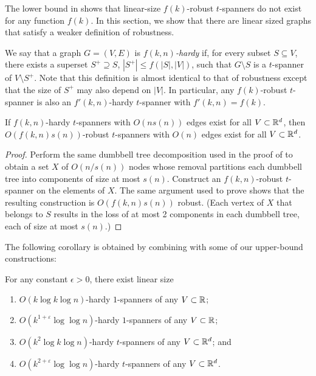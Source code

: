 \documentclass{patmorin}
\newcommand{\eps}{\varepsilon}
\begin{document}
The lower bound in  shows that linear-size
$f(k)$-robust $t$-spanners do not exist for any function $f(k)$.  In this
section, we show that there are linear sized graphs that satisfy a weaker
definition of robustness.

We say that a graph $G=(V,E)$ is \emph{$f(k,n)$-hardy} if, for every
subset $S\subseteq V$, there exists a superset $S^+\supseteq S$,
$|S^+|\le f(|S|,|V|)$, such that $G\setminus S$ is a $t$-spanner of
$V\setminus S^+$.  Note that this definition is almost identical to that
of robustness except that the size of $S^+$ may also depend on $|V|$.  In particular, any $f(k)$-robust $t$-spanner is also an $f'(k,n)$-hardy $t$-spanner with $f'(k,n)=f(k)$.

\begin{thm}
  If $f(k,n)$-hardy $t$-spanners with $O(n s(n))$ edges exist for
  all $V\subset\mathbb{R}^d$, then $O(f(k,n)s(n))$-robust $t$-spanners with
  $O(n)$ edges exist for all $V\subset\mathbb{R}^d$.
\end{thm}

\begin{proof}
  Perform the same dumbbell tree decomposition used in the proof of
   to obtain a set $X$ of $O(n/s(n))$ nodes whose removal
  partitions each dumbbell tree into components of size at most $s(n)$.
  Construct an $f(k,n)$-robust $t$-spanner on the elements of $X$.
  The same argument used to prove  shows that the resulting
  construction is $O(f(k,n)s(n))$ robust.  (Each vertex of $X$ that
  belongs to $S$ results in the loss of at most 2 components in each
  dumbbell tree, each of size at most $s(n)$.)
\end{proof}

The following corollary is obtained by combining 
with some of our upper-bound constructions:
\begin{cor}
  For any constant $\epsilon >0$,
  there exist linear size
  \begin{enumerate}
    \item $O(k\log k\log n)$-hardy $1$-spanners of any
      $V\subset \mathbb{R}$;
    \item $O(k^{1+\eps}\log\log n)$-hardy $1$-spanners of any
      $V\subset \mathbb{R}$;
    \item $O(k^2\log k\log n)$-hardy $t$-spanners of any
      $V\subset \mathbb{R}^d$; and
    \item $O(k^{2+\eps}\log\log n)$-hardy $t$-spanners of any
      $V\subset \mathbb{R}^d$.
  \end{enumerate}
\end{cor}
\end{document}
